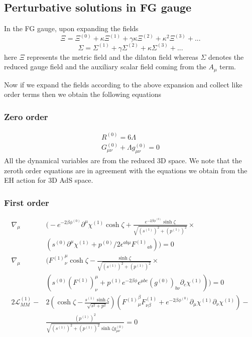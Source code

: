 \subsection{Perturbative solutions in FG gauge}
In the FG gauge, upon expanding the fields 
\begin{equation}
    \Xi = \Xi^{(0)} + \kappa \Xi^{(1)} + \gamma \kappa \Xi^{(2)} + \kappa^2 \Xi^{(3)} + ...
\end{equation}
\begin{equation}
    \Sigma = \Sigma^{(1)} + \gamma \Sigma^{(2)} + \kappa \Sigma^{(3)} + ...
\end{equation}
here $\Xi$ represents the metric field and the dilaton field whereas $\Sigma$ denotes the reduced gauge field and the auxiliary scalar field coming from the $A_\mu$ term. 

Now if we expand the fields according to the above expansion and collect like order terms then we obtain the following equations 
\subsubsection{Zero order}
\begin{align}
    R^{(0)} = 6\Lambda \\ 
    G_{\mu\nu}^{(0)} + \Lambda g_{\mu\nu}^{(0)} = 0
\end{align}
All the dynamical variables are from the reduced 3D space. We note that the zeroth order equations are in agreement with the equations we obtain from the EH action for 3D AdS space. 


\subsubsection{First order}
\begin{align}
    \nabla_{\mu}& \Biggl ( -e^{-2\beta\phi^{(0)}} \partial^\mu\chi^{(1)}\cosh\zeta + \frac{e^{-2\beta\phi^{(0)}}\sinh\zeta}{\sqrt{(s^{(1)})^2 + (p^{(1)})^2} } \times \nonumber \\ & \left ( s^{(0)}\partial^\mu\chi^{(1)} + p^{(0)}/2 \epsilon^{ab\mu}{F^{(1)}}_{ab}\right ) \Biggl ) = 0 \\
    \nabla_{\mu}& \Biggl ( {F^{(1)}}^\mu_\nu\cosh\zeta - \frac{\sinh\zeta}{\sqrt{(s^{(1)})^2 + (p^{(1)})^2} } \times \nonumber \\ & \left ( s^{(0)}(F^{(1)})^\mu_\nu + p^{(1)}e^{-2\beta\phi}\epsilon^{\mu bc}(g^{(0)})_{b\nu} \partial_c \chi^{(1)}\right ) \Biggl ) = 0 \\ 
2\mathcal{L}^{(1)}_{MM} - &2 \left ( \cosh \zeta - \frac{s^{(1)}\sinh\zeta}{\sqrt{s^2+p^2} } \right ) \left ( {F^{(1)}}^\beta_\mu {F^{(1)}_{\nu\beta}} + e^{-2\beta\phi^{(0)}}\partial_\mu\chi^{(1)}\partial_\nu\chi^{(1)} \right ) - \nonumber \\ & \frac{(p^{(1)})^2}{\sqrt{(s^{(1)})^2+(p^{(1)})^2}\sinh\zeta {g^{(0)}_{\mu\nu}} } = 0
\end{align}

